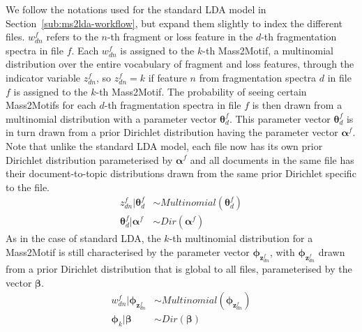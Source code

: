 We follow the notations used for the standard LDA model in Section~\ref{sub:ms2lda-workflow}, but expand them slightly to index the different files. $w_{dn}^f$ refers to the $n$-th fragment or loss feature in the $d$-th fragmentation spectra in file $f$. Each $w_{dn}^f$ is assigned to the $k$-th Mass2Motif, a multinomial distribution over the entire vocabulary of fragment and loss features, through the indicator variable $z_{dn}^f$, so $z_{dn}^f=k$ if feature $n$ from fragmentation spectra $d$ in file $f$ is assigned to the $k$-th Mass2Motif. The probability of seeing certain Mass2Motifs for each $d$-th fragmentation spectra in file $f$ is then drawn from a multinomial distribution with a parameter vector $\boldsymbol{\theta}_{d}^f$. This parameter vector $\boldsymbol{\theta}_{d}^f$ is in turn drawn from a prior Dirichlet distribution having the parameter vector $\boldsymbol{\alpha}^f$. Note that unlike the standard LDA model, each file now has its own prior Dirichlet distribution parameterised by $\boldsymbol{\alpha}^f$ and all documents in the same file has their document-to-topic distributions drawn from the same prior Dirichlet specific to the file.
\begin{align}
z_{dn}^f \vert \boldsymbol{\theta}_{d}^f &\sim Multinomial(\boldsymbol{\theta}_{d}^f) \label{eq:dir-multi-1a}\\
\boldsymbol{\theta}_{d}^f \vert \boldsymbol{\alpha}^f &\sim Dir(\boldsymbol{\alpha}^f) \label{eq:dir-multi-1b}
\end{align}
As in the case of standard LDA, the $k$-th multinomial distribution for a Mass2Motif is still characterised by the parameter vector $\boldsymbol{\phi}_{\boldsymbol{z}_{dn}^f}$, with $\boldsymbol{\phi}_{\boldsymbol{z}_{dn}^f}$ drawn from a prior Dirichlet distribution that is global to all files, parameterised by the vector $\boldsymbol{\beta}$. 
\begin{align}
{w}_{dn}^f \vert \boldsymbol{\phi}_{\boldsymbol{z}_{dn}^f} &\sim Multinomial(\boldsymbol{\phi}_{\boldsymbol{z}_{dn}^f}) \label{eq:dir-multi-2a} \\
\boldsymbol{\phi}_{k} \vert \boldsymbol{\beta} &\sim Dir(\boldsymbol{\beta}) \label{eq:dir-multi-2b}
\end{align}

